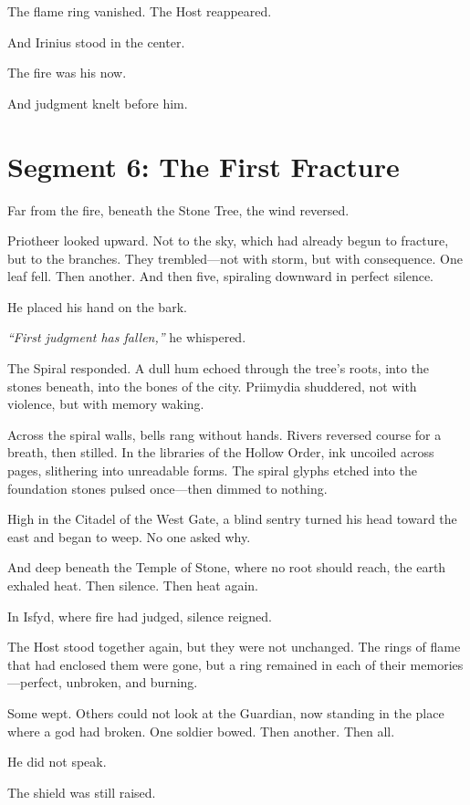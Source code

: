 \documentclass[9pt]{article}
\begin{document}
The flame ring vanished. The Host reappeared.

And Irinius stood in the center.

The fire was his now.

And judgment knelt before him.

\newpage

\section*{Segment 6: The First Fracture}

Far from the fire, beneath the Stone Tree, the wind reversed.

Priotheer looked upward. Not to the sky, which had already begun to fracture, but to the branches. They trembled—not with storm, but with consequence. One leaf fell. Then another. And then five, spiraling downward in perfect silence.

He placed his hand on the bark.

\textit{``First judgment has fallen,''} he whispered.

The Spiral responded. A dull hum echoed through the tree's roots, into the stones beneath, into the bones of the city. Priimydia shuddered, not with violence, but with memory waking.

Across the spiral walls, bells rang without hands. Rivers reversed course for a breath, then stilled. In the libraries of the Hollow Order, ink uncoiled across pages, slithering into unreadable forms. The spiral glyphs etched into the foundation stones pulsed once—then dimmed to nothing.

High in the Citadel of the West Gate, a blind sentry turned his head toward the east and began to weep. No one asked why.

And deep beneath the Temple of Stone, where no root should reach, the earth exhaled heat. Then silence. Then heat again.

In Isfyd, where fire had judged, silence reigned.

The Host stood together again, but they were not unchanged. The rings of flame that had enclosed them were gone, but a ring remained in each of their memories—perfect, unbroken, and burning.

Some wept. Others could not look at the Guardian, now standing in the place where a god had broken. One soldier bowed. Then another. Then all.

He did not speak.

The shield was still raised.
\end{document}
